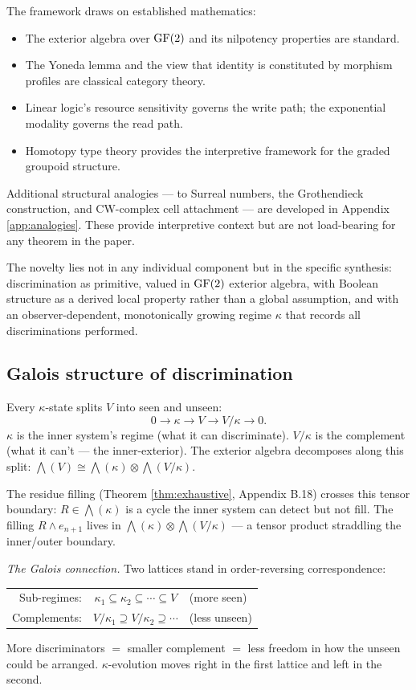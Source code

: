 The framework draws on established mathematics:
\begin{itemize}[nosep]
  \item The exterior algebra over $\operatorname{GF}(2)$ and its nilpotency
    properties are standard.
  \item The Yoneda lemma and the view that identity is
    constituted by morphism profiles are classical category theory.
  \item Linear logic's resource sensitivity governs the write
    path; the exponential modality governs the read path.
  \item Homotopy type theory provides the interpretive framework
    for the graded groupoid structure.
\end{itemize}
Additional structural analogies --- to Surreal numbers,
the Grothendieck construction, and CW-complex cell
attachment --- are developed in Appendix \ref{app:analogies}.
These provide interpretive context but are not
load-bearing for any theorem in the paper.

The novelty lies not in any individual component but in the
specific synthesis: discrimination as primitive, valued in
$\operatorname{GF}(2)$ exterior algebra, with Boolean structure as a derived
local property rather than a global assumption, and with an
observer-dependent, monotonically growing regime $\kappa$
that records all discriminations performed.


\subsection{Galois structure of discrimination}
\label{sec:galois}

Every $\kappa$-state splits $V$ into seen and unseen:
\begin{equation}
  0 \to \kappa \to V \to V/\kappa \to 0.
\end{equation}
$\kappa$ is the inner system's regime (what it can
discriminate). $V/\kappa$ is the complement (what it
can't --- the inner-exterior). The exterior algebra
decomposes along this split:
$\bigwedge(V) \cong \bigwedge(\kappa) \otimes
\bigwedge(V/\kappa)$.

The residue filling (Theorem \ref{thm:exhaustive},
Appendix B.18) crosses this tensor boundary:
$R \in \bigwedge(\kappa)$ is a cycle the inner system
can detect but not fill. The filling $R \wedge e_{n+1}$
lives in $\bigwedge(\kappa) \otimes \bigwedge(V/\kappa)$
--- a tensor product straddling the inner/outer boundary.

\emph{The Galois connection.}
Two lattices stand in order-reversing correspondence:
\begin{center}
\begin{tabular}{rcl}
Sub-regimes: & $\kappa_1 \subseteq \kappa_2 \subseteq
  \cdots \subseteq V$ & (more seen) \\
Complements: & $V/\kappa_1 \supseteq V/\kappa_2
  \supseteq \cdots$ & (less unseen)
\end{tabular}
\end{center}
More discriminators $=$ smaller complement $=$ less
freedom in how the unseen could be arranged.
$\kappa$-evolution moves right in the first lattice and
left in the second.

